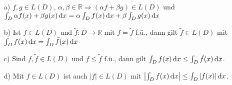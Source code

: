 \begin{proposition}\leavevmode
	\begin{itemize}
		\item[a)] $f,g\in L(D),\,\alpha,\beta\in\mathbb{R}\Rightarrow (\alpha f+\beta g)\in L(D)$
		und \\$\int_D \alpha f(x)+\beta g(x) \,\text{d}x =\alpha\int_D f(x) \,\text{d}x+\beta\int_D g(x) \,\text{d}x$
		\item[b)] Ist $f\in L(D)$ und $\tilde{f}\colon D\to\mathbb{R}$ mit $f=\tilde{f}$ f.ü., dann gilt $\tilde{f}\in L(D)$ mit $\int_D f(x) \,\text{d}x=\int_D \tilde{f}(x) \,\text{d}x$
		\item[c)] Sind $f, \tilde{f}\in L(D)$ und $f\leq \tilde{f}$ f.ü., dann gilt $\int_D f(x) \,\text{d}x \leq\int_D \tilde{f}(x) \,\text{d}x$.
		\item[d)] Mit $f\in L(D)$ ist auch $|f|\in L(D)$ mit $\left|\int_D f(x) \,\text{d}x\right|\leq\int_D |f(x)| \,\text{d}x$. 
	\end{itemize}
\end{proposition}
